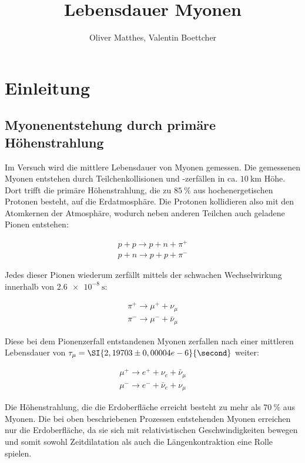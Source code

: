 \documentclass[slug=LM, room=Andreas-Schubert-Bau\,\ K\ 1A, supervisor=Anne-Sophie\ Berthold, coursedate=13.\ 12.\ 2019]{../../Lab_Report_LaTeX/lab_report}
\title{Lebensdauer Myonen}
\author{Oliver Matthes, Valentin Boettcher}
\begin{document}
\maketitle

\section{Einleitung}
\label{sec:einl}

\subsection{Myonenentstehung durch primäre Höhenstrahlung}
\label{sec:myonenenst}

Im Versuch wird die mittlere Lebensdauer von Myonen gemessen.
Die gemessenen Myonen entstehen durch Teilchenkollisionen und -zerfällen in ca.
\(\SI{10}{\kilo\metre}\) Höhe. Dort trifft die primäre Höhenstrahlung, die zu
\(\SI{85}{\percent}\) aus hochenergetischen Protonen besteht, auf die Erdatmosphäre.
Die Protonen kollidieren also mit den Atomkernen der Atmosphäre, wodurch neben anderen Teilchen
auch geladene Pionen entstehen:

\begin{align}\label{eq:pionen}
 p + p \rightarrow p + n + \pi^+ \\
 p + n \rightarrow p + p + \pi^-
\end{align}

Jedes dieser Pionen wiederum zerfällt mittels der schwachen Wechselwirkung innerhalb von
\(\SI{2,6e-8}{\second}\):

\begin{align}\label{eq:myonen}
\pi^+ \rightarrow \mu^+ + \nu_\mu \\
\pi^- \rightarrow \mu^- + \bar\nu_\mu
\end{align}

Diese bei dem Pionenzerfall entstandenen Myonen zerfallen nach einer mittleren Lebensdauer von
\(\tau_\mu = \SI{2,19703\pm0,00004e-6}{\second}\) weiter:

\begin{align}
        \mu^+ \rightarrow e^+ + \nu_e + \bar\nu_\mu \\
        \mu^- \rightarrow e^- + \bar\nu_e + \nu_\mu
\end{align}

Die Höhenstrahlung, die die Erdoberfläche erreicht besteht zu mehr als \(\SI{70}{\percent}\)
aus Myonen. Die bei oben beschriebenen Prozessen entstehenden Myonen erreichen nur die
Erdoberfläche, da sie sich mit relativistischen Geschwindigkeiten bewegen und somit sowohl
Zeitdilatation als auch die Längenkontraktion eine Rolle spielen.\\
\end{document}

